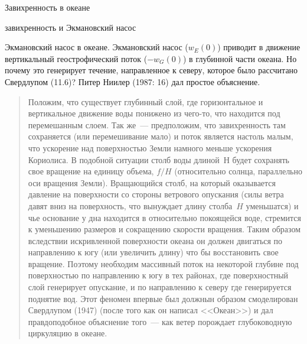 \begin{chapter}{Завихренность в океане}
\begin{section}{завихренность и Экмановский насос}
\begin{paragraph}{Экмановский насос в океане.}
Экмановский насос ($w_E (0)$) приводит в движение вертикальный
геострофический поток ($-w_G (0)$) в глубинной части океана. Но почему
это генерирует течение, направленное к северу, которое было рассчитано
Свердлупом (11.6)? Питер Ниилер (1987: 16) дал простое объяснение.
%
\begin{quotation}
Положим, что существует глубинный слой, где горизонтальное и
вертикальное движение воды понижено из чего-то, что находится под
перемешанным слоем. Так же~--- предположим, что завихренность там
сохраняется (или перемешивание мало) и поток является настоль малым,
что ускорение над поверхностью Земли намного меньше ускорения
Кориолиса. В подобной ситуации столб воды длиной~$Н$ будет сохранять
свое вращение на единицу объема, $f/H$ (относительно солнца, параллельно
оси вращения Земли). Вращающийся столб, на который оказывается
давление на поверхности со стороны ветрового опускания (силы ветра
давят вниз на поверхность, что вынуждает длину столба~$H$ уменьшатся) и
чье основание у дна находится в относительно покоящейся воде,
стремится к уменьшению размеров и сокращению скорости вращения. Таким
образом вследствии искривленной поверхности океана он должен двигаться
по направлению к югу (или увеличить длину) что бы восстановить свое
вращение. Поэтому необходим массивный поток на некоторой глубине под
поверхностью по направлению к югу в тех районах, где поверхностный
слой генерирует опускание, и по направлению к северу где генерируется
поднятие вод. Этот феномен впервые был должнын образом смоделирован
Свердлупом (1947) (после того как он написал <<Океан>>) и дал
правдоподобное объяснение того~--- как ветер порождает глубоководную
циркуляцию в океане.
\end{quotation}

\end{paragraph}
\end{section}
\end{chapter}
